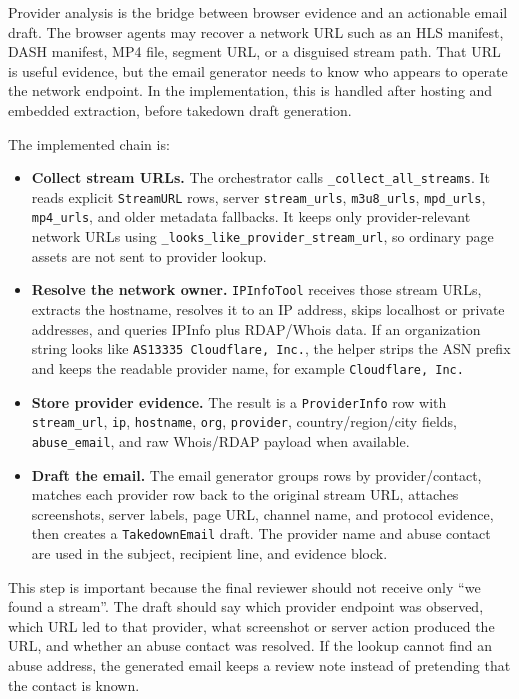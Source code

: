 Provider analysis is the bridge between browser evidence and an actionable email draft.
The browser agents may recover a network URL such as an HLS manifest, DASH manifest, MP4
file, segment URL, or a disguised stream path. That URL is useful evidence, but the
email generator needs to know who appears to operate the network endpoint. In the
implementation, this is handled after hosting and embedded extraction, before takedown
draft generation.

The implemented chain is:
\begin{itemize}
  \item \textbf{Collect stream URLs.} The orchestrator calls
  \texttt{\_collect\_all\_streams}. It reads explicit \texttt{StreamURL} rows, server
  \texttt{stream\_urls}, \texttt{m3u8\_urls}, \texttt{mpd\_urls},
  \texttt{mp4\_urls}, and older metadata fallbacks. It keeps only provider-relevant
  network URLs using \texttt{\_looks\_like\_provider\_stream\_url}, so ordinary page
  assets are not sent to provider lookup.
  \item \textbf{Resolve the network owner.} \texttt{IPInfoTool} receives those stream
  URLs, extracts the hostname, resolves it to an IP address, skips localhost or private
  addresses, and queries IPInfo plus RDAP/Whois data. If an organization string looks
  like \texttt{AS13335 Cloudflare, Inc.}, the helper strips the ASN prefix and keeps the
  readable provider name, for example \texttt{Cloudflare, Inc.}
  \item \textbf{Store provider evidence.} The result is a \texttt{ProviderInfo} row with
  \texttt{stream\_url}, \texttt{ip}, \texttt{hostname}, \texttt{org},
  \texttt{provider}, country/region/city fields, \texttt{abuse\_email}, and raw
  Whois/RDAP payload when available.
  \item \textbf{Draft the email.} The email generator groups rows by provider/contact,
  matches each provider row back to the original stream URL, attaches screenshots,
  server labels, page URL, channel name, and protocol evidence, then creates a
  \texttt{TakedownEmail} draft. The provider name and abuse contact are used in the
  subject, recipient line, and evidence block.
\end{itemize}

This step is important because the final reviewer should not receive only
``we found a stream''. The draft should say which provider endpoint was observed, which
URL led to that provider, what screenshot or server action produced the URL, and whether
an abuse contact was resolved. If the lookup cannot find an abuse address, the generated
email keeps a review note instead of pretending that the contact is known.

